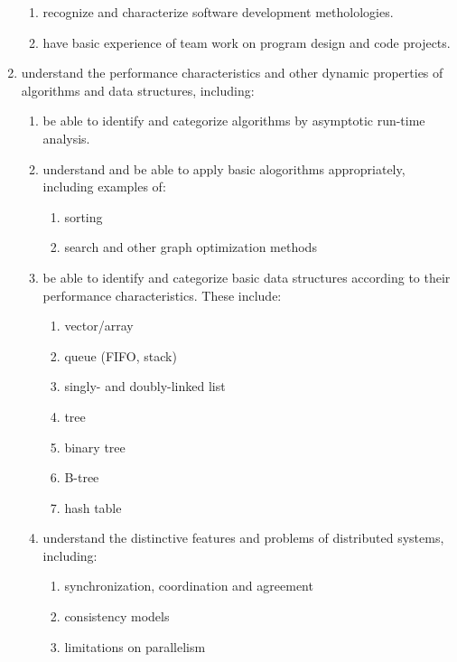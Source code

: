 \documentclass[draft]{article}
\begin{document}
\begin{enumerate}
\begin{enumerate}
   \item recognize and characterize software development metholologies.

    \item have basic experience of team work on program design and code projects.
\end{enumerate}


\item understand the performance characteristics and other dynamic
  properties of algorithms and data structures, including:

  \begin{enumerate}
    \item be able to identify and categorize algorithms by asymptotic run-time analysis.

      \item understand and be able to apply basic alogorithms appropriately, including examples of:
       \begin{enumerate}  
         \item sorting
         \item search and other graph optimization methods
        \end{enumerate}

   \item be able to identify and categorize basic data structures according to their performance characteristics. These include:
    \begin{enumerate}  
      \item vector/array
      \item queue (FIFO, stack)
      \item singly- and doubly-linked list
      \item tree
      \item binary tree
      \item B-tree
      \item hash table
    \end{enumerate}

\item understand the distinctive features and  problems of distributed systems, including:
    \begin{enumerate}  
      \item synchronization, coordination and agreement
      \item consistency models
      \item limitations on parallelism
    \end{enumerate}        


\end{enumerate}
\end{enumerate}
\end{document}
